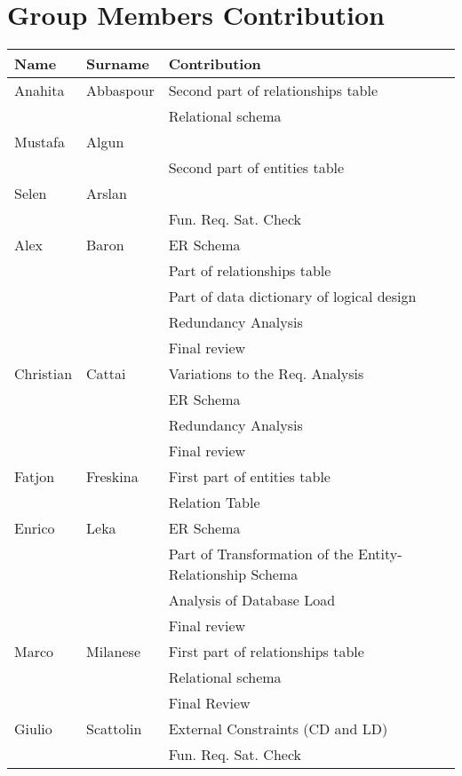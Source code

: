 \section{Group Members Contribution}

\begin{longtable}{|p{}|p{}|p{}|}
	\hline
	\textbf{Name} & \textbf{Surname} & \textbf{Contribution} \\
	\hline \hline
	Anahita & Abbaspour & Second part of relationships table \\
	& & Relational schema \\
	\hline
	Mustafa & Algun & \\
	& & Second part of entities table \\
	\hline
	Selen & Arslan & \\
	& & Fun. Req. Sat. Check \\
	\hline
	Alex & Baron & ER Schema \\
	& & Part of relationships table \\
	& & Part of data dictionary of logical design \\
	& & Redundancy Analysis \\ 
	& & Final review \\
	\hline
	Christian & Cattai & Variations to the Req. Analysis\\
	& & ER Schema \\
	& & Redundancy Analysis \\
	& & Final review \\
	\hline
	Fatjon & Freskina & First part of entities table\\
	& & Relation Table \\
	\hline
	Enrico & Leka & ER Schema \\
	& & Part of Transformation of the Entity-Relationship Schema \\
	& & Analysis of Database Load \\ 
	& & Final review \\
	\hline
	Marco & Milanese & First part of relationships table\\
	& & Relational schema \\
	& & Final Review \\
	\hline
	Giulio & Scattolin & External Constraints (CD and LD)\\
	& & Fun. Req. Sat. Check \\
	\hline
\end{longtable}
